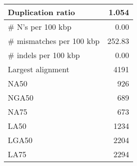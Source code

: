 \documentclass[12pt,a4paper]{article}
\begin{document}
\begin{table}[ht]
\begin{center}
\begin{tabular}{|l*{1}{|r}|}
Duplication ratio & 1.054 \\ \hline
\# N's per 100 kbp & 0.00 \\ \hline
\# mismatches per 100 kbp & 252.83 \\ \hline
\# indels per 100 kbp & 0.00 \\ \hline
Largest alignment & 4191 \\ \hline
NA50 & 926 \\ \hline
NGA50 & 689 \\ \hline
NA75 & 673 \\ \hline
LA50 & 1234 \\ \hline
LGA50 & 2204 \\ \hline
LA75 & 2294 \\ \hline
\end{tabular}
\end{center}
\end{table}
\end{document}
